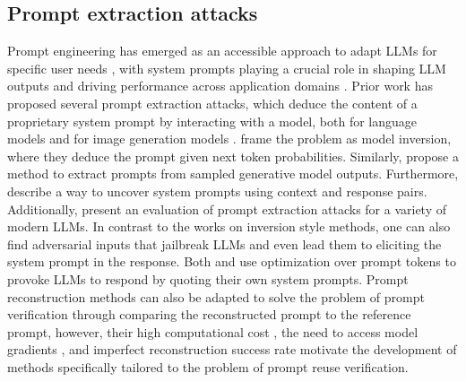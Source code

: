 


\subsection{Prompt extraction attacks}
Prompt engineering has emerged as an accessible approach to adapt LLMs for specific user needs \citep{liu2023pre}, with system prompts playing a crucial role in shaping LLM outputs and driving performance across application domains \citep{ng2023neurips}.
Prior work has proposed several prompt extraction attacks, which deduce the content of a proprietary system prompt by interacting with a model, both for language models \citep{morris2023language, zhang2024effective, sha2024prompt, yang2024prsa} and for image generation models \citep{wen2024hard}. 
\citet{morris2023language} frame the problem as model inversion, where they deduce the prompt given next token probabilities.
Similarly, \citet{sha2024prompt} propose a method to extract prompts from sampled generative model outputs. 
Furthermore, \citet{yang2024prsa} describe a way to uncover system prompts using context and response pairs.
Additionally, \citet{zhang2024effective} present an evaluation of prompt extraction attacks for a variety of modern LLMs. 
In contrast to the works on inversion style methods, one can also find adversarial inputs that jailbreak LLMs \citep{zou2023universal, cherepanova2024talking, geiping2024coercing} and even lead them to eliciting the system prompt in the response. Both \citet{hui2024pleak} and \citet{geiping2024coercing} use optimization over prompt tokens to provoke LLMs to respond by quoting their own system prompts. Prompt reconstruction methods can also be adapted to solve the problem of prompt verification through comparing the reconstructed prompt to the reference prompt, however, their high computational cost \citep{hui2024pleak, geiping2024coercing}, the need to access model gradients \citep{geiping2024coercing}, and imperfect reconstruction success rate \citep{hui2024pleak, zhang2024effective, geiping2024coercing} motivate the development of methods specifically tailored to the problem of prompt reuse verification.

